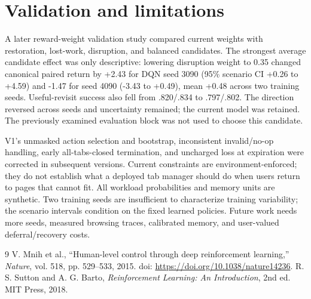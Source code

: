 \documentclass[9pt,twocolumn]{article}
\begin{document}
\section{Validation and limitations}
A later reward-weight validation study compared current weights with restoration, lost-work, disruption, and balanced candidates. The strongest average candidate effect was only descriptive: lowering disruption weight to 0.35 changed canonical paired return by +2.43 for DQN seed 3090 (95\% scenario CI +0.26 to +4.59) and -1.47 for seed 4090 (-3.43 to +0.49), mean +0.48 across two training seeds. Useful-revisit success also fell from .820/.834 to .797/.802. The direction reversed across seeds and uncertainty remained; the current model was retained. The previously examined evaluation block was not used to choose this candidate.

V1's unmasked action selection and bootstrap, inconsistent invalid/no-op handling, early all-tabs-closed termination, and uncharged loss at expiration were corrected in subsequent versions. Current constraints are environment-enforced; they do not establish what a deployed tab manager should do when users return to pages that cannot fit. All workload probabilities and memory units are synthetic. Two training seeds are insufficient to characterize training variability; the scenario intervals condition on the fixed learned policies. Future work needs more seeds, measured browsing traces, calibrated memory, and user-valued deferral/recovery costs.

\clearpage
\onecolumn
\begin{thebibliography}{9}
 V. Mnih et al., ``Human-level control through deep reinforcement learning,'' \emph{Nature}, vol. 518, pp. 529--533, 2015. doi: \url{https://doi.org/10.1038/nature14236}.
 R. S. Sutton and A. G. Barto, \emph{Reinforcement Learning: An Introduction}, 2nd ed. MIT Press, 2018.
\end{thebibliography}
\end{document}
